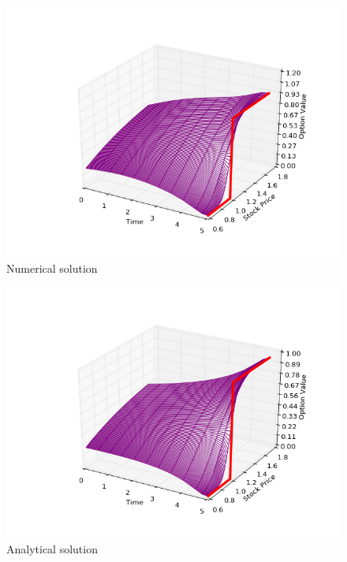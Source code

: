 \documentclass[11pt,a4paper]{extarticle}
\begin{document}
	\begin{minipage}{\linewidth}
      \centering
      \begin{minipage}{0.3\linewidth}
          \begin{figure}[H]
              \includegraphics[width=\linewidth]{Figures/c-o-n-call-num}
              \caption{Numerical solution}
          \end{figure}
      \end{minipage}
      \hspace{0.05\linewidth}
      \begin{minipage}{0.3\linewidth}
          \begin{figure}[H]
              \includegraphics[width=\linewidth]{Figures/c-o-n-call-analyt}
              \caption{Analytical solution}
          \end{figure}
      \end{minipage}
  \end{minipage}
\end{document}
